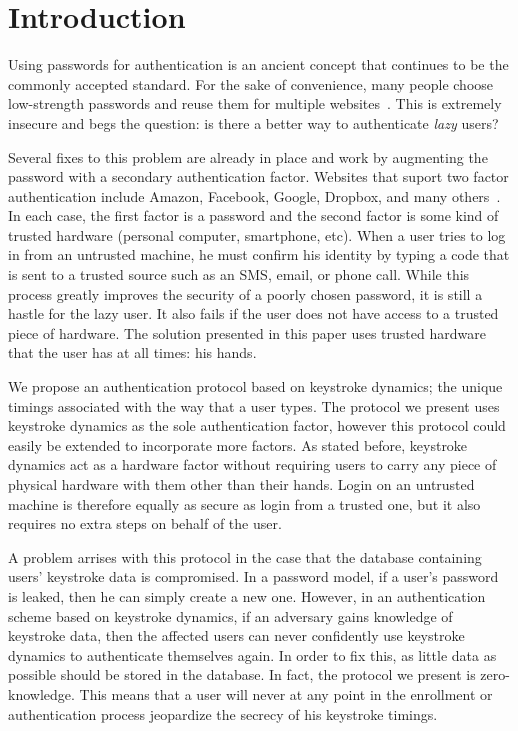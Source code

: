 \documentclass[11pt]{article}
\begin{document}
\section{Introduction}
Using passwords for authentication is an ancient concept that continues to be the commonly accepted standard. For the sake of convenience, many people choose low-strength passwords and reuse them for multiple websites~\cite{Florencio:2007:LSW:1242572.1242661}. This is extremely insecure and begs the question: is there a better way to authenticate \textit{lazy} users?

Several fixes to this problem are already in place and work by augmenting the password with a secondary authentication factor. Websites that suport two factor authentication include Amazon, Facebook, Google, Dropbox, and many others~\cite{2fac}. In each case, the first factor is a password and the second factor is some kind of trusted hardware (personal computer, smartphone, etc). When a user tries to log in from an untrusted machine, he must confirm his identity by typing a code that is sent to a trusted source such as an SMS, email, or phone call. While this process greatly improves the security of a poorly chosen password, it is still a hastle for the lazy user. It also fails if the user does not have access to a trusted piece of hardware. The solution presented in this paper uses trusted hardware that the user has at all times: his hands.

We propose an authentication protocol based on keystroke dynamics; the unique timings associated with the way that a user types. The protocol we present uses keystroke dynamics as the sole authentication factor, however this protocol could easily be extended to incorporate more factors. As stated before, keystroke dynamics act as a hardware factor without requiring users to carry any piece of physical hardware with them other than their hands. Login on an untrusted machine is therefore equally as secure as login from a trusted one, but it also requires no extra steps on behalf of the user.

A problem arrises with this protocol in the case that the database containing users' keystroke data is compromised. In a password model, if a user's password is leaked, then he can simply create a new one. However, in an authentication scheme based on keystroke dynamics, if an adversary gains knowledge of keystroke data, then the affected users can never confidently use keystroke dynamics to authenticate themselves again. In order to fix this, as little data as possible should be stored in the database. In fact, the protocol we present is zero-knowledge. This means that a user will never at any point in the enrollment or authentication process jeopardize the secrecy of his keystroke timings.
\end{document}
